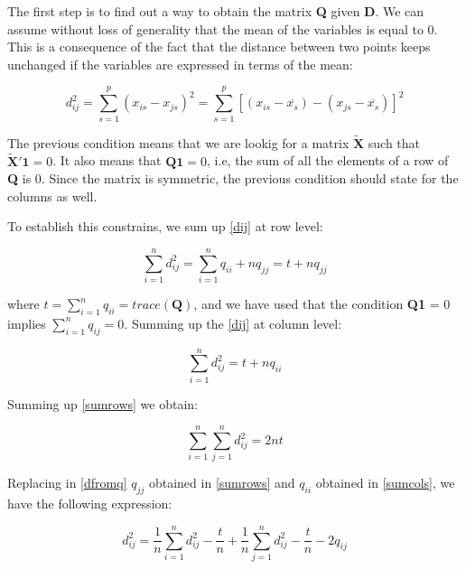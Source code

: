 \documentclass[11pt]{report}
\begin{document}
\indent The first step is to find out a way to obtain the matrix \textbf{Q} given
\textbf{D}. We can assume without loss of generality that the mean of the variables
is equal to 0. This is a consequence of the fact that the distance between two points
keeps unchanged if the variables are expressed in terms of the mean:


\begin{equation} \label{dtraslated}
d_{ij}^2 = \sum_{s = 1}^p (x_{is} - x_{js})^2 = \sum_{s=1} ^p [(x_{is} - \overline{x_s})- (x_{js} - \overline{x_s})]^2
\end{equation}

\indent The previous condition means that we are lookig for a matrix  $\mathbf{\widetilde{X}}$
such that $\mathbf{\widetilde{X}'}\mathbf{1} = 0$. It also means that $\mathbf{Q}\mathbf{1} = 0$,
i.e, the sum of all the elements of a row of \textbf{Q} is 0. Since the matrix is 
symmetric, the previous condition should state for the columns as well. 

\indent To establish this constrains, we sum up \ref{dij} at row level:

\begin{equation} \label{sumrows}
\sum_{i = 1}^n d_{ij}^2 = \sum_{i = 1}^n q_{ii} + nq_{jj} = t + nq_{jj}
\end{equation}

where $t = \sum_{i = 1}^n q_{ii} = trace(\mathbf{Q})$, and we have used that the
condition \textbf{Q}\textbf{1} = 0 implies $\sum_{i = 1}^n q_{ij} = 0$. Summing 
up the \ref{dij} at column level:

\begin{equation} \label{sumcols}
\sum_{i = 1}^n d_{ij}^2 = t + nq_{ii}
\end{equation}

\indent Summing up \ref{sumrows} we obtain:

\begin{equation} \label{doublesum}
\sum_{i = 1}^n\sum_{j = 1}^n d_{ij}^2 = 2nt
\end{equation}

\indent Replacing in \ref{dfromq} $q_{jj}$ obtained in \ref{sumrows} and $q_{ii}$
obtained in \ref{sumcols}, we have the following expression:

\begin{equation} \label{generaldij}
d_{ij}^2 = \frac{1}{n}\sum_{i = 1}^n d_{ij}^2 - \frac{t}{n} + \frac{1}{n} \sum_{j = 1}^n d_{ij}^2 -\frac{t}{n} -2q_{ij}
\end{equation}
\end{document}

